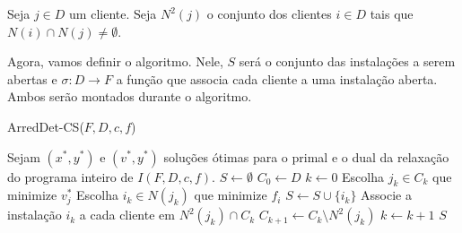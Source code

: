 \begin{definition}
    Seja $j\in D$ um cliente. Seja $N^2(j)$ o conjunto dos clientes $i \in D$ tais que $N(i) \cap N(j) \neq \emptyset$.
\end{definition}
Agora, vamos definir o algoritmo. Nele, $S$ será o conjunto das instalações a serem abertas e $\sigma : D \rightarrow F $ a função que associa cada cliente a uma instalação aberta. Ambos serão montados durante o algoritmo.
\begin{algorithm}
    \caption{\sc ArredDet-CS($F,D,c,f$)}
    \label{fl:plrounding}
    \begin{algorithmic}[1]
        \State Sejam $(x^*,y^*)$ e $(v^*,y^*)$ soluções ótimas para o primal e o dual da relaxação do programa inteiro de $I(F,D,c,f)$.
        \State $S \gets \emptyset$
        \State $C_0 \gets D$ 
        \State $k \gets 0$
        \State Escolha $j_k \in C_k$ que minimize $v_j^*$
        \State Escolha $i_k \in N(j_k)$ que minimize $f_{i}$
        \State $S \gets S \cup \{i_k\}$
        \State Associe a instalação $i_k$ a cada cliente em $N^2(j_k) \cap C_k$
        \State $C_{k+1} \gets C_k \setminus N^2(j_k)$
        \State $k \gets k+1$
        \EndWhile
        \State \Return $S$
    \end{algorithmic}
\end{algorithm}

